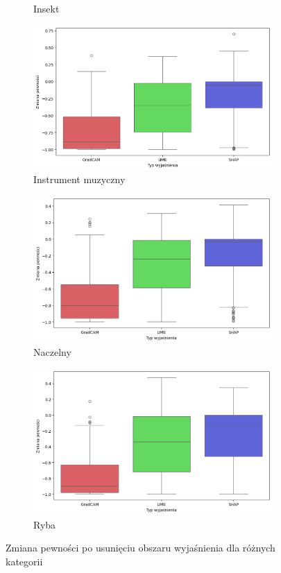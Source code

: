 \begin{figure}[h]
\begin{subfigure}[b]{0.3\textwidth}
		\caption{Insekt}  \label{rys:base_confidence_no_exp_insect}
	\end{subfigure}
	\begin{subfigure}[b]{0.3\textwidth}
		\centering\includegraphics[width=.9\textwidth]{img/base_confidence_no_exp_music}
		\caption{Instrument muzyczny}  \label{rys:base_confidence_no_exp_music}
	\end{subfigure}
	\begin{subfigure}[b]{0.3\textwidth}
		\centering\includegraphics[width=.9\textwidth]{img/base_confidence_no_exp_primate}
		\caption{Naczelny}  \label{rys:base_confidence_no_exp_primate}
	\end{subfigure}
	\begin{subfigure}[b]{0.3\textwidth}
		\centering\includegraphics[width=.9\textwidth]{img/base_confidence_no_exp_fish}
		\caption{Ryba}  \label{rys:base_confidence_no_exp_fish}
	\end{subfigure}
	\caption{Zmiana pewności po usunięciu obszaru wyjaśnienia dla różnych kategorii}
	\label{rys:category_confidence_no_exp}
\end{figure}

